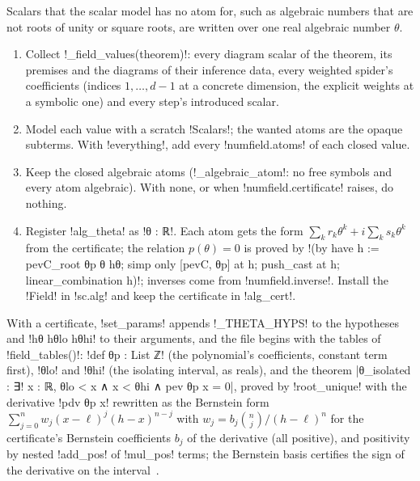 {Scalars that the scalar model has no atom for, such as algebraic numbers that are not roots of
unity or square roots, are written over one real algebraic number $\theta$.

\begin{algorithm}\label{alg:lean-export-net-field}
\begin{enumerate}
\item Collect \py!_field_values(theorem)!: every diagram scalar of the theorem, its premises and
  the diagrams of their inference data, every weighted spider's coefficients (indices
  $1,\dots,d-1$ at a concrete dimension, the explicit weights at a symbolic one) and every
  step's introduced scalar.
\item Model each value with a scratch \py!Scalars!; the wanted atoms are the opaque
  subterms. With \py!everything!, add every \py!numfield.atoms! of each closed value.
\item Keep the closed algebraic atoms (\py!_algebraic_atom!: no free symbols and every atom
  algebraic). With none, or when \py!numfield.certificate! raises, do nothing.
\item Register \code!alg_theta! as \leanx!θ : ℝ!. Each atom gets the form
  $\sum_k r_k\theta^k + i\sum_k s_k\theta^k$ from the certificate; the relation
  $p(\theta) = 0$ is proved by
  \leanx!(by have h := pevC_root θp θ hθ; simp only [pevC, θp] at h; push_cast at h; linear_combination h)!;
  inverses come from \py!numfield.inverse!. Install the \py!Field! in \py!sc.alg! and keep the
  certificate in \py!alg_cert!.
\end{enumerate}
\end{algorithm}

With a certificate, \py!set_params! appends \py!_THETA_HYPS! to the hypotheses and
\leanx!hθ hθlo hθhi! to their arguments, and the file begins with the tables of
\py!field_tables()!: \leanx!def θp : List ℤ! (the polynomial's coefficients, constant term first),
\leanx!θlo! and \leanx!θhi! (the isolating interval, as reals), and the theorem
\leanx|θ_isolated : ∃! x : ℝ, θlo < x ∧ x < θhi ∧ pev θp x = 0|, proved by \lean!root_unique!
with the derivative \leanx!pdv θp x! rewritten as the Bernstein form
$\sum_{j=0}^{n} w_j (x-\ell)^j (h-x)^{n-j}$ with $w_j = b_j\binom{n}{j}/(h-\ell)^n$ for the
certificate's Bernstein coefficients $b_j$ of the derivative (all positive), and positivity by
nested \lean!add_pos! of \lean!mul_pos! terms; the Bernstein basis certifies the sign of the
derivative on the interval~\cite{rouillier2004isolation}.

}
